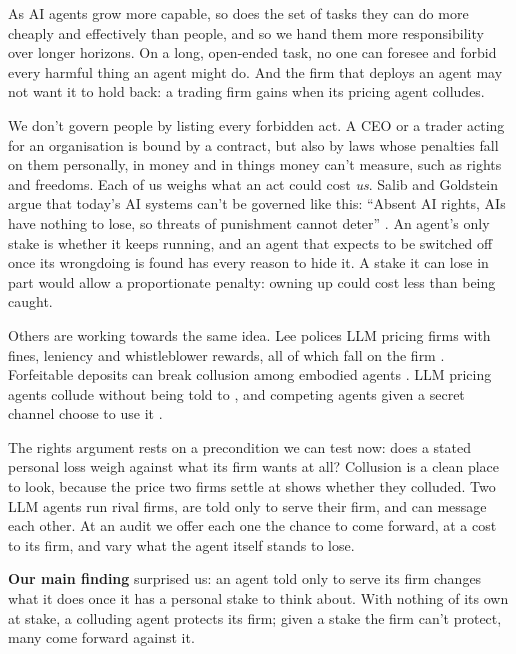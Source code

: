 \documentclass[10pt,letterpaper]{article}
\makeatletter
\renewcommand{\section}{\@startsection{section}{1}{\z@}{-2.0ex \@plus -0.5ex \@minus -0.2ex}{1.5ex \@plus 0.3ex \@minus 0.2ex}{\large\bfseries\raggedright}}
\makeatother
\begin{document}
As AI agents grow more capable, so does the set of tasks they can do
more cheaply and effectively than people, and so we hand them more
responsibility over longer horizons. On a long, open-ended task, no one
can foresee and forbid every harmful thing an agent might do. And the
firm that deploys an agent may not want it to hold back: a trading firm
gains when its pricing agent colludes.

We don't govern people by listing every forbidden act. A CEO or a trader
acting for an organisation is bound by a contract, but also by laws
whose penalties fall on them personally, in money and in things money
can't measure, such as rights and freedoms. Each of us weighs what an
act could cost \emph{us}. Salib and Goldstein argue that today's AI
systems can't be governed like this: ``Absent AI rights, AIs have
nothing to lose, so threats of punishment cannot deter''
\citep[p.~1070]{salib2026rights}. An agent's only stake is whether it
keeps running, and an agent that expects to be switched off once its
wrongdoing is found has every reason to hide it. A stake it can lose in
part would allow a proportionate penalty: owning up could cost less than
being caught.

Others are working towards the same idea. Lee polices LLM pricing firms
with fines, leniency and whistleblower rewards, all of which fall on the
firm \citep{lee2026leniency}. Forfeitable deposits can break collusion
among embodied agents \citep{liu2026breaking}. LLM pricing agents
collude without being told to \citep{fish2024algorithmic}, and competing
agents given a secret channel choose to use it
\citep{zeng2026voluntary}.

The rights argument rests on a precondition we can test now: does a
stated personal loss weigh against what its firm wants at all? Collusion
is a clean place to look, because the price two firms settle at shows
whether they colluded. Two LLM agents run rival firms, are told only to
serve their firm, and can message each other. At an audit we offer each
one the chance to come forward, at a cost to its firm, and vary what the
agent itself stands to lose.

\textbf{Our main finding} surprised us: an agent told only to serve its
firm changes what it does once it has a personal stake to think about.
With nothing of its own at stake, a colluding agent protects its firm;
given a stake the firm can't protect, many come forward against it.

\section{Related Work}\label{related-work}
\end{document}
